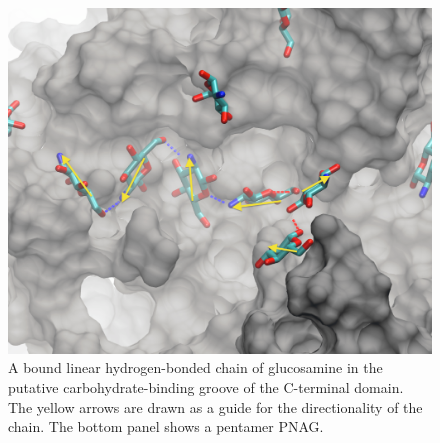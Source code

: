 \begin{figure}[htbp]
\centering
\includegraphics[width=6.25in]{figures/results4/glucosamine_binding_direction_suggestive.pdf}
\caption[Polymer directionality]{A bound linear hydrogen-bonded chain of glucosamine in the putative carbohydrate-binding groove of the C-terminal domain.  The yellow arrows are drawn as a guide for the directionality of the chain. The bottom panel shows a pentamer PNAG.}
\label{fig:directionality}
\end{figure}

\begin{singlespace}


\end{singlespace}




